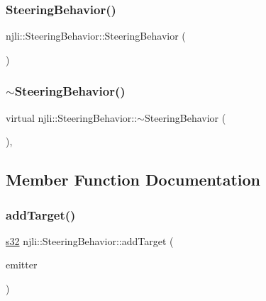 \subsubsection{\texorpdfstring{Steering\+Behavior()}{SteeringBehavior()}\hspace{0.1cm}{\footnotesize\ttfamily [3/3]}}
{\footnotesize\ttfamily njli\+::\+Steering\+Behavior\+::\+Steering\+Behavior (\begin{DoxyParamCaption}\item[{const \mbox{\hyperlink{classnjli_1_1_steering_behavior}{Steering\+Behavior}} \&}]{ }\end{DoxyParamCaption})\hspace{0.3cm}{\ttfamily [protected]}}

\mbox{\label{classnjli_1_1_steering_behavior_adf0866d38fe7dd3aaf8048b80911a93d}} 
\subsubsection{\texorpdfstring{$\sim$\+Steering\+Behavior()}{~SteeringBehavior()}}
{\footnotesize\ttfamily virtual njli\+::\+Steering\+Behavior\+::$\sim$\+Steering\+Behavior (\begin{DoxyParamCaption}{ }\end{DoxyParamCaption})\hspace{0.3cm}{\ttfamily [protected]}, {\ttfamily [virtual]}}



\subsection{Member Function Documentation}
\mbox{\label{classnjli_1_1_steering_behavior_aa197011275830165605ced9e47250b72}} 
\subsubsection{\texorpdfstring{add\+Target()}{addTarget()}}
{\footnotesize\ttfamily \mbox{\hyperlink{_util_8h_aa62c75d314a0d1f37f79c4b73b2292e2}{s32}} njli\+::\+Steering\+Behavior\+::add\+Target (\begin{DoxyParamCaption}\item[{\mbox{\hyperlink{classnjli_1_1_node}{Node}} $\ast$}]{emitter }\end{DoxyParamCaption})}



